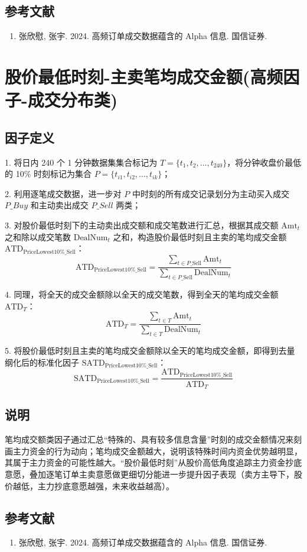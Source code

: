 \documentclass{article}
\begin{document}
\subsection{参考文献}
\begin{enumerate}
    \item 张欣慰, 张宇. 2024. 高频订单成交数据蕴含的 Alpha 信息. 国信证券.
\end{enumerate}

\section{股价最低时刻-主卖笔均成交金额(高频因子-成交分布类)}

\subsection{因子定义}

1. 将日内 240 个 1 分钟数据集集合标记为 \( T = \{t_1, t_2, \dots, t_{240}\} \)，将分钟收盘价最低的 10\% 时刻标记为集合 \( P = \{t_{i1}, t_{i2}, \dots, t_{ik}\} \)；

2. 利用逐笔成交数据，进一步对 \( P \) 中时刻的所有成交记录划分为主动买入成交 \( P\_Buy \) 和主动卖出成交 \( P\_Sell \) 两类；

3. 对股价最低时刻下的主动卖出成交额和成交笔数进行汇总，根据其成交额 \( \mathrm{Amt}_t \) 之和除以成交笔数 \( \mathrm{DealNum}_t \) 之和，构造股价最低时刻且主卖的笔均成交金额 \( \mathrm{ATD}_{\mathrm{PriceLowest10\%\_Sell}} \)：
\begin{equation}
    \mathrm{ATD}_{\mathrm{PriceLowest10\%\_Sell}} = \frac{\sum_{t \in P\_\mathrm{Sell}} \mathrm{Amt}_t}{\sum_{t \in P\_\mathrm{Sell}} \mathrm{DealNum}_t}
\end{equation}

4. 同理，将全天的成交金额除以全天的成交笔数，得到全天的笔均成交金额 \( \mathrm{ATD}_T \)：
\begin{equation}
    \mathrm{ATD}_T = \frac{\sum_{t \in T} \mathrm{Amt}_t}{\sum_{t \in T} \mathrm{DealNum}_t}
\end{equation}

5. 将股价最低时刻且主卖的笔均成交金额除以全天的笔均成交金额，即得到去量纲化后的标准化因子 \( \mathrm{SATD}_{\mathrm{PriceLowest10\%\_Sell}} \)：
\begin{equation}
    \mathrm{SATD}_{\mathrm{PriceLowest10\%\_Sell}} = \frac{\mathrm{ATD}_{\mathrm{PriceLowest10\%\_Sell}}}{\mathrm{ATD}_T}
\end{equation}

\subsection{说明}
笔均成交额类因子通过汇总“特殊的、具有较多信息含量”时刻的成交金额情况来刻画主力资金的行为动向；笔均成交金额越大，说明该特殊时间内资金优势越明显，其属于主力资金的可能性越大。“股价最低时刻”从股价高低角度追踪主力资金抄底意愿，叠加逐笔订单主卖意愿做更细切分能进一步提升因子表现（卖方主导下，股价越低，主力抄底意愿越强，未来收益越高）。

\subsection{参考文献}
\begin{enumerate}
    \item 张欣慰, 张宇. 2024. 高频订单成交数据蕴含的 Alpha 信息. 国信证券.
\end{enumerate}
\end{document}
